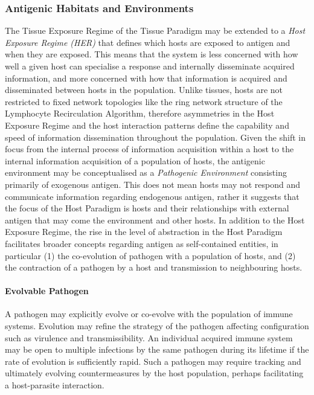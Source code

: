 %
%
\subsubsection{Antigenic Habitats and Environments}
\label{sec:hosts:paradigm:exposures:habitats}
The Tissue Exposure Regime of the Tissue Paradigm may be extended to a \emph{Host Exposure Regime (HER)} that defines which hosts are exposed to antigen and when they are exposed. This means that the system is less concerned with how well a given host can specialise a response and internally disseminate acquired information, and more concerned with how that information is acquired and disseminated between hosts in the population. Unlike tissues, hosts are not restricted to fixed network topologies like the ring network structure of the Lymphocyte Recirculation Algorithm, therefore asymmetries in the Host Exposure Regime and the host interaction patterns define the capability and speed of information dissemination throughout the population. 
Given the shift in focus from the internal process of information acquisition within a host to the internal information acquisition of a population of hosts, the antigenic environment may be conceptualised as a \emph{Pathogenic Environment} consisting primarily of exogenous antigen. This does not mean hosts may not respond and communicate information regarding endogenous antigen, rather it suggests that the focus of the Host Paradigm is hosts and their relationships with external antigen that may come the environment and other hosts.
In addition to the Host Exposure Regime, the rise in the level of abstraction in the Host Paradigm facilitates broader concepts regarding antigen as self-contained entities, in particular (1) the co-evolution of pathogen with a population of hosts, and (2) the contraction of a pathogen by a host and transmission to neighbouring hosts. 

\paragraph{Evolvable Pathogen}
A pathogen may explicitly evolve or co-evolve with the population of immune systems. Evolution may refine the strategy of the pathogen affecting configuration such as virulence and transmissibility. An individual acquired immune system may be open to multiple infections by the same pathogen during its lifetime if the rate of evolution is sufficiently rapid. Such a pathogen may require tracking and ultimately evolving countermeasures by the host population, perhaps facilitating a host-parasite interaction.

